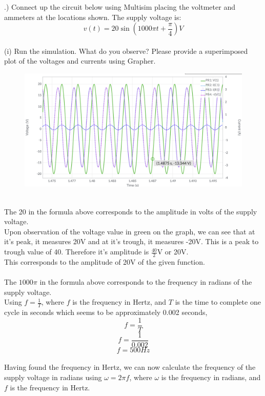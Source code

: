 \documentclass[12pt]{article}
\begin{document}
.) Connect up the circuit below using Multisim placing the voltmeter and ammeters at the locations shown. The supply voltage is:\\
\[v(t) = 20 \sin (1000 \pi t + \frac{\pi}{4}) V\]\\
(i) Run the simulation. What do you observe? Please provide a superimposed plot of the voltages and currents using Grapher.\\
\begin{figure}[!h] 
	\begin{centering}
		\includegraphics[keepaspectratio = true, width = 6in]{q1(i).PNG}
	\end{centering}
\end{figure}\\
\noindent The 20 in the formula above corresponds to the amplitude in volts of the supply voltage.\\
Upon observation of the voltage value in green on the graph, we can see that at it's peak, it measures 20V and at it's trough, it measures -20V. This is a peak to trough value of 40. Therefore it's amplitude is \(\frac{40}{2}\)V or 20V.\\
This corresponds to the amplitude of 20V of the given function.\\
\\
The \(1000\pi\) in the formula above corresponds to the frequency in radians of the supply voltage.\\
Using \(f = \frac{1}{T}\), where \(f\) is the frequency in Hertz, and \(T\) is the time to complete one cycle in seconds which seems to be approximately 0.002 seconds,\\
\[f = \frac{1}{T}\]
\[f = \frac{1}{0.002}\]
\[f = 500Hz\]\\
Having found the frequency in Hertz, we can now calculate the frequency of the supply voltage in radians using \(\omega = 2 \pi f\), where \(\omega\) is the frequency in radians, and \(f\) is the frequency in Hertz.\\
\end{document}
